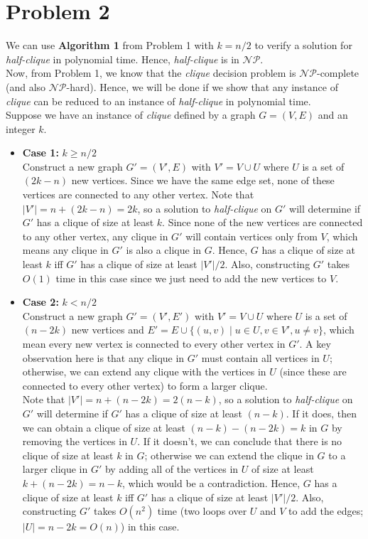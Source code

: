 \documentclass{article}
\begin{document}
\section{Problem 2}
  We can use \textbf{Algorithm 1} from Problem 1 with $k = n/2$ to verify a solution for \textit{half-clique} in polynomial time.
  Hence, \textit{half-clique} is in $\mathcal{NP}$. \\
  Now, from Problem 1, we know that the \textit{clique} decision problem is $\mathcal{NP}$-complete (and also $\mathcal{NP}$-hard).
  Hence, we will be done if we show that any instance of \textit{clique} can be reduced to an instance of \textit{half-clique} in polynomial time. \\
  Suppose we have an instance of \textit{clique} defined by a graph $G = (V, E)$ and an integer $k$.
  \begin{itemize}
    \item \textbf{Case 1:} $k \ge n/2$ \\
    Construct a new graph $G' = (V', E)$ with $V' = V \cup U$ where $U$ is a set of $(2k - n)$ new vertices.
    Since we have the same edge set, none of these vertices are connected to any other vertex.
    Note that $|V'| = n + (2k - n) = 2k$, so a solution to \textit{half-clique} on $G'$ will determine if $G'$ has a clique of size at least $k$.
    Since none of the new vertices are connected to any other vertex, any clique in $G'$ will contain vertices only from $V$, which means any clique in $G'$ is also a clique in $G$.
    Hence, $G$ has a clique of size at least $k$ iff $G'$ has a clique of size at least $|V'|/2$.
    Also, constructing $G'$ takes $O(1)$ time in this case since we just need to add the new vertices to $V$.

    \item \textbf{Case 2:} $k < n/2$ \\
    Construct a new graph $G' = (V', E')$ with $V' = V \cup U$ where $U$ is a set of $(n - 2k)$ new vertices and $E' = E \cup \{(u, v) \mid u \in U, v \in V', u \neq v\}$, which mean every new vertex is connected to every other vertex in $G'$.
    A key observation here is that any clique in $G'$ must contain all vertices in $U$; otherwise, we can extend any clique with the vertices in $U$ (since these are connected to every other vertex) to form a larger clique. \\
    Note that $|V'| = n + (n - 2k) = 2(n - k)$, so a solution to \textit{half-clique} on $G'$ will determine if $G'$ has a clique of size at least $(n - k)$.
    If it does, then we can obtain a clique of size at least $(n - k) - (n - 2k) = k$ in $G$ by removing the vertices in $U$.
    If it doesn't, we can conclude that there is no clique of size at least $k$ in $G$; otherwise we can extend the clique in $G$ to a larger clique in $G'$ by adding all of the vertices in $U$ of size at least $k + (n - 2k) = n - k$, which would be a contradiction.
    Hence, $G$ has a clique of size at least $k$ iff $G'$ has a clique of size at least $|V'|/2$.
    Also, constructing $G'$ takes $O(n^2)$ time (two loops over $U$ and $V$ to add the edges; $|U| = n - 2k = O(n)$) in this case.
  \end{itemize}
\end{document}
